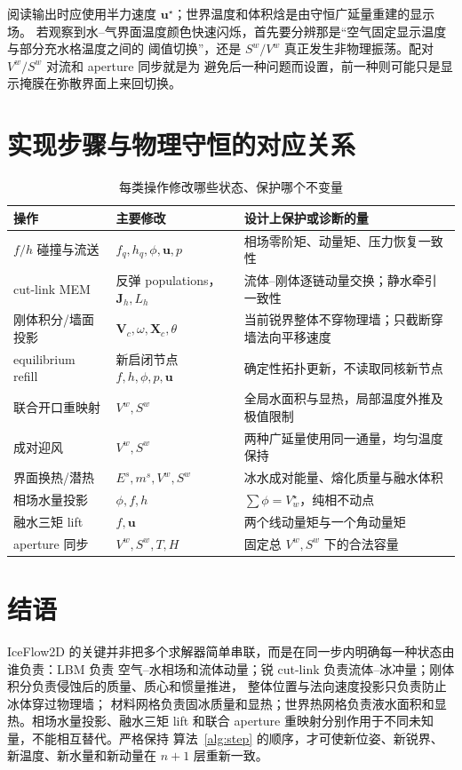 \documentclass[UTF8,zihao=-4]{ctexart}
\newcommand{\vect}[1]{\boldsymbol{#1}}
\numberwithin{equation}{section}
\begin{document}
阅读输出时应使用半力速度 $\vect u^\star$；世界温度和体积焓是由守恒广延量重建的显示场。
若观察到水--气界面温度颜色快速闪烁，首先要分辨那是“空气固定显示温度与部分充水格温度之间的
阈值切换”，还是 $S^w/V^w$ 真正发生非物理振荡。配对 $V^w/S^w$ 对流和 aperture 同步就是为
避免后一种问题而设置，前一种则可能只是显示掩膜在弥散界面上来回切换。

\section{实现步骤与物理守恒的对应关系}

\begin{table}[H]
\centering
\caption{每类操作修改哪些状态、保护哪个不变量}
\begin{tabularx}{\textwidth}{@{}p{}YY@{}}
\toprule
操作 & 主要修改 & 设计上保护或诊断的量 \\
\midrule
$f/h$ 碰撞与流送 & $f_q,h_q,\phi,\vect u,p$ & 相场零阶矩、动量矩、压力恢复一致性 \\
cut-link MEM & 反弹 populations，$\vect J_h,L_h$ & 流体--刚体逐链动量交换；静水牵引一致性 \\
刚体积分/墙面投影 & $\vect V_c,\omega,\vect X_c,\theta$ & 当前锐界整体不穿物理墙；只截断穿墙法向平移速度 \\
equilibrium refill & 新启闭节点 $f,h,\phi,p,\vect u$ & 确定性拓扑更新，不读取同核新节点 \\
联合开口重映射 & $V^w,S^w$ & 全局水面积与显热，局部温度外推及极值限制 \\
成对迎风 & $V^w,S^w$ & 两种广延量使用同一通量，均匀温度保持 \\
界面换热/潜热 & $E^s,m^s,V^w,S^w$ & 冰水成对能量、熔化质量与融水体积 \\
相场水量投影 & $\phi,f,h$ & $\sum\phi=V_w^\star$，纯相不动点 \\
融水三矩 lift & $f,\vect u$ & 两个线动量矩与一个角动量矩 \\
aperture 同步 & $V^w,S^w,T,H$ & 固定总 $V^w,S^w$ 下的合法容量 \\
\bottomrule
\end{tabularx}
\end{table}

\section{结语}

IceFlow2D 的关键并非把多个求解器简单串联，而是在同一步内明确每一种状态由谁负责：LBM 负责
空气--水相场和流体动量；锐 cut-link 负责流体--冰冲量；刚体积分负责侵蚀后的质量、质心和惯量推进，
整体位置与法向速度投影只负责防止冰体穿过物理墙；
材料网格负责固冰质量和显热；世界热网格负责液水面积和显热。相场水量投影、融水三矩 lift
和联合 aperture 重映射分别作用于不同未知量，不能相互替代。严格保持
算法~\ref{alg:step} 的顺序，才可使新位姿、新锐界、新温度、新水量和新动量在 $n+1$ 层重新一致。
\end{document}
